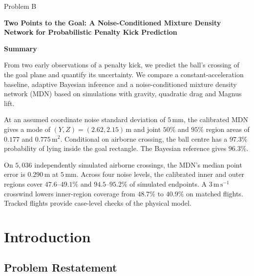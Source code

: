 \documentclass[11pt,a4paper]{article}
\newcommand{\problemletter}{B}
\newcommand{\papertitle}{Two Points to the Goal: A Noise-Conditioned Mixture Density Network for Probabilistic Penalty Kick Prediction}
\begin{document}
\thispagestyle{cover}
\begin{center}
  \vspace*{1.0cm}
  {\large Problem \problemletter\par}
  \vspace{1.2cm}
  {\LARGE\bfseries \papertitle\par}
  \vspace{1.2cm}
  {\large\bfseries Summary\par}
\end{center}
\vspace{0.2cm}

From two early observations of a penalty kick, we predict the ball's crossing of the goal plane and quantify its uncertainty. We compare a constant-acceleration baseline, adaptive Bayesian inference and a noise-conditioned mixture density network (MDN) based on simulations with gravity, quadratic drag and Magnus lift.

At an assumed coordinate noise standard deviation of $5\,\mathrm{mm}$, the calibrated MDN gives a mode of $(Y,Z)=(2.62,2.15)\,\mathrm{m}$ and joint $50\%$ and $95\%$ region areas of $0.177$ and $0.775\,\mathrm{m^2}$. Conditional on airborne crossing, the ball centre has a $97.3\%$ probability of lying inside the goal rectangle. The Bayesian reference gives $96.3\%$.

On $5{,}036$ independently simulated airborne crossings, the MDN's median point error is $0.290\,\mathrm{m}$ at $5\,\mathrm{mm}$. Across four noise levels, the calibrated inner and outer regions cover $47.6$--$49.1\%$ and $94.5$--$95.2\%$ of simulated endpoints. A $3\,\mathrm{m\,s^{-1}}$ crosswind lowers inner-region coverage from $48.7\%$ to $40.9\%$ on matched flights. Tracked flights provide case-level checks of the physical model.

\clearpage
\tableofcontents
\clearpage

\section{Introduction}
\subsection{Problem Restatement}
\end{document}
